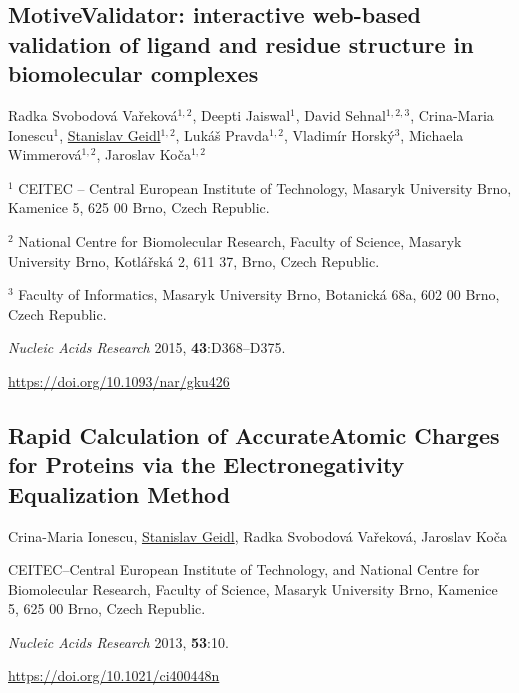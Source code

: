 \begin{center}
\section{\centering MotiveValidator: interactive
web-based validation of ligand and residue structure in biomolecular complexes}

Radka Svobodová Vařeková$^{1, 2}$,
Deepti Jaiswal$^1$,
David Sehnal$^{1, 2, 3}$,
Crina-Maria Ionescu$^1$,
\underline{Stanislav Geidl}$^{1, 2}$,
Lukáš Pravda$^{1, 2}$,
Vladimír Horský$^3$,
Michaela Wimmerová$^{1, 2}$,
Jaroslav Koča$^{1, 2}$

\vspace{1cm}

$^1$ CEITEC -- Central European Institute of Technology,
Masaryk University Brno, Kamenice 5, 625 00 Brno, Czech Republic.

$^2$ National Centre for Biomolecular Research, Faculty of Science,
Masaryk University Brno, Kotlářská 2, 611 37, Brno, Czech Republic.

$^3$ Faculty of Informatics, Masaryk University Brno, Botanická 68a, 602 00 Brno,
Czech Republic.

\vspace{1cm}

\textit{Nucleic Acids Research} 2015, \textbf{43}:D368--D375.

\vspace{1cm}

\url{https://doi.org/10.1093/nar/gku426}

\end{center}



\begin{center}
\section{\centering Rapid Calculation of AccurateAtomic Charges
for Proteins via the Electronegativity Equalization Method}

Crina-Maria Ionescu,
\underline{Stanislav Geidl},
Radka Svobodová Vařeková,
Jaroslav Koča

\vspace{1cm}

CEITEC--Central European Institute of Technology, and National
Centre for Biomolecular Research, Faculty of Science, Masaryk
University Brno, Kamenice 5, 625 00 Brno, Czech Republic.

\vspace{1cm}

\textit{Nucleic Acids Research} 2013, \textbf{53}:10.

\vspace{1cm}

\url{https://doi.org/10.1021/ci400448n}

\end{center}

%

